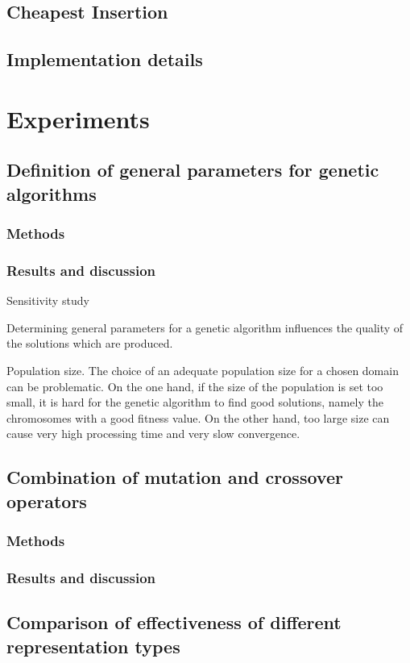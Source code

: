 \documentclass[a4paper, 12pt, headings=standardclasses]{scrartcl}
\begin{document}
\subsection{Cheapest Insertion}
\subsection{Implementation details}



\section{Experiments}

\subsection{Definition of general parameters for genetic algorithms}
\subsubsection{Methods}
\subsubsection{Results and discussion}
Sensitivity study

Determining general parameters for a genetic algorithm  influences the quality of the solutions which are produced. 

Population size. 
The choice of an adequate population size for a chosen domain can be problematic. On the one hand, if the size of the population is set too small, it is hard for the genetic algorithm to find good solutions, namely the chromosomes with a good fitness value. On the other hand, too large size can cause very high processing time and very slow convergence. 

\subsection{Combination of mutation and crossover operators}
\subsubsection{Methods}
\subsubsection{Results and discussion}

\subsection{Comparison of effectiveness of different representation types}
\end{document}
